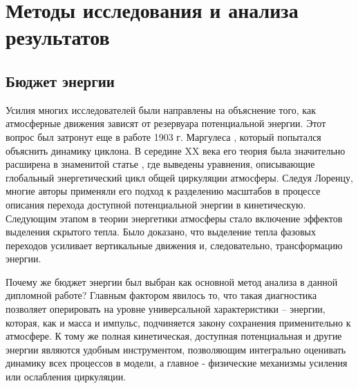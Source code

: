 \section{Методы исследования и анализа результатов}
\subsection{Бюджет энергии}
Усилия многих исследователей были направлены на объяснение того, как атмосферные движения зависят от резервуара потенциальной энергии. Этот вопрос был затронут еще в работе 1903 г. Маргулеса \citep{Nagata1993}, который попытался объяснить динамику циклона. В середине XX века его теория была значительно расширена в знаменитой статье \citep{Lorenz1955}, где выведены уравнения, описывающие глобальный энергетический цикл общей циркуляции атмосферы. Следуя Лоренцу, многие авторы применяли его подход к разделению масштабов в процессе описания перехода доступной потенциальной энергии в кинетическую. Следующим этапом в теории энергетики атмосферы стало включение эффектов выделения скрытого тепла. Было доказано, что выделение тепла фазовых переходов усиливает вертикальные движения и, следовательно, трансформацию энергии.

Почему же бюджет энергии был выбран как основной метод анализа в данной дипломной работе? Главным фактором явилось то, что такая диагностика позволяет оперировать на уровне универсальной характеристики -- энергии, которая, как и масса и импульс, подчиняется закону сохранения применительно к атмосфере. К тому же полная кинетическая, доступная потенциальная и другие энергии являются удобным инструментом, позволяющим интегрально оценивать динамику всех процессов в модели, а главное - физические механизмы усиления или ослабления циркуляции.

